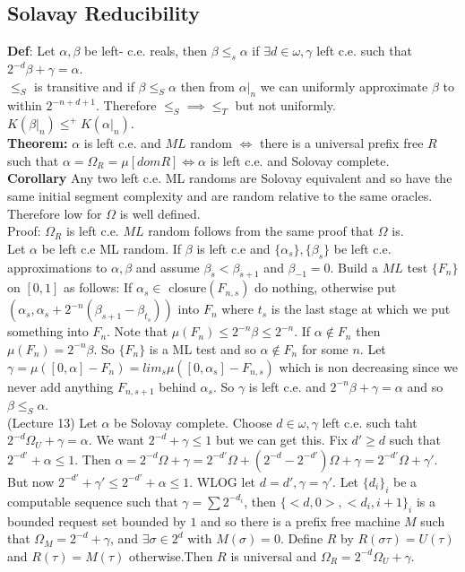 \documentclass{article}
\begin{document}
       \subsection{Solavay Reducibility}
       \textbf{Def}: Let $\alpha,\beta$ be left- c.e. reals, then $\beta \leq_s \alpha$ if $\exists d \in \omega, \gamma$ left c.e. such that $2^{-d} \beta + \gamma = \alpha$.\\
       $\leq_S$ is transitive and if $\beta \leq_S \alpha$ then from $\alpha|_n$ we can uniformly approximate $\beta$ to within $2^{-n+d+1}$. Therefore $\leq_S  \implies \leq_T$ but not uniformly. $K(\beta|_n) \leq^+ K(\alpha|_n)$.\\
       \textbf{Theorem:} $\alpha$ is left c.e. and $ML$ random $\iff$ there is a universal prefix free $R$ such that $\alpha = \Omega_R = \mu[dom R] \iff \alpha $ is left c.e. and Solovay complete.\\
       \textbf{Corollary} Any two left c.e. ML randoms are Solovay equivalent and so have the same initial segment complexity and are random relative to the same oracles. Therefore low for $\Omega$ is well defined.\\
       Proof:  $\Omega_R$ is left c.e. $ML$ random follows from the same proof that $\Omega$ is. \\
       Let $\alpha$ be left c.e ML random. If $\beta$ is left c.e and $\{\alpha_s\}, \{\beta_s\}$ be left c.e. approximations to $\alpha, \beta$ and assume $\beta_s < \beta_{s+1}$ and $\beta_{-1} = 0$. Build a $ML$ test $\{F_n\}$ on $[0,1]$ as follows: If $\alpha_s \in $ closure$(F_{n,s})$ do nothing, otherwise put $(\alpha_s, \alpha_s + 2^{-n} (\beta_{s+1} - \beta_{t_s}))$ into $F_n$ where $t_s$ is the last stage at which we put something into $F_n$. Note that $\mu(F_n) \leq 2^{-n} \beta \leq 2^{-n}$. If $\alpha \not \in F_n$ then $\mu(F_n) = 2^{-n} \beta$. So $\{F_n\}$ is a ML test and so $\alpha \not \in F_n$ for some $n$. Let $\gamma = \mu([0,\alpha] - F_n) = lim_s \mu([0,\alpha_s]- F_{n,s})$ which is non decreasing since we never add anything $F_{n,s+1}$ behind $\alpha_s$. So $\gamma$ is left c.e. and $2^{-n} \beta + \gamma = \alpha$ and so $\beta \leq_S\alpha$.  
       \\
       (Lecture 13) Let $\alpha$ be Solovay complete. Choose $d\in \omega, \gamma$ left c.e. such taht $2^{-d} \Omega_U+ \gamma = \alpha$. We want $2^{-d} + \gamma \leq 1$ but we can get this. Fix $d' \geq d$ such that $2^{-d'} + \alpha \leq 1$. Then $\alpha = 2^{-d} \Omega + \gamma = 2^{-d'} \Omega + (2^{-d} - 2^{-d'})\Omega + \gamma = 2^{-d'}\Omega + \gamma'$. But now $2^{-d'} +\gamma' \leq 2^{-d'}+\alpha \leq 1$. WLOG let $d = d', \gamma = \gamma'$. Let $\{d_i\}_i$ be a computable sequence such that $\gamma = \sum 2^{-d_i}$, then $\{<d,0>, <d_i,i+1\}_i$ is a bounded request set bounded by $1$ and so there is a prefix free machine $M$ such that $\Omega_M = 2^{-d} + \gamma$, and $\exists \sigma \in 2^d$ with $M(\sigma) = 0$. Define $R$ by $R(\sigma\tau) = U(\tau)$ and $R(\tau) = M(\tau)$ otherwise.Then $R$ is universal and $\Omega_R = 2^{-d}\Omega_U + \gamma$.
       
\end{document}
